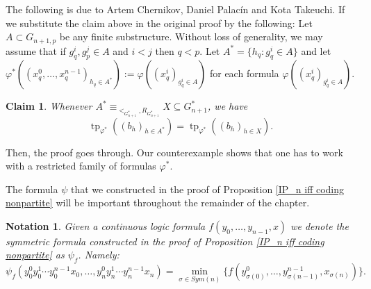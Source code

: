 \documentclass{amsart}
\newtheorem*{claim}{Claim}
\newtheorem{notation}{Notation}
\newtheorem{external claim}[teor]{Claim}
\DeclareMathOperator{\tp}{{tp}}
\begin{document}
The following is due to Artem Chernikov, Daniel Palacín and Kota Takeuchi. If we substitute the claim above in the original proof by the following: Let $A\subset G_{n+1,p}$ be any finite substructure. Without loss of generality, we may assume that if $g^i_q,g^j_p\in A$ and $i<j$ then $q<p$. Let $A^*=\{ h_q: g^i_q\in A \}$ and let $\varphi^*((x^0_q,\dots,x^{n-1}_q)_{h_q\in A^*}):=\varphi((x^i_q)_{g^i_q\in A})$ for each formula $\varphi((x^i_q)_{g^i_q\in A})$. 
\begin{claim}
  Whenever $A^*\equiv_{<_{G^*_{n+1}},R_{G^*_{n+1}}}X \subseteq G^*_{n+1}$, we have $$ \tp_{\varphi^*}( (b_h)_{h\in A^*} )=\tp_{\varphi^*}((b_h)_{h\in X}) .$$
\end{claim}
Then, the proof goes through. Our counterexample shows that one has to work with a restricted family of formulas $\varphi^*$.


The formula $\psi$ that we constructed in the proof of Proposition \ref{IP_n iff coding nonpartite} will be important throughout the remainder of the chapter.

\begin{notation}\label{notation psi_f}
     Given a continuous logic formula $f(y_0,\dots,y_{n-1},x)$ we denote the symmetric formula constructed in the proof of Proposition \ref{IP_n iff coding nonpartite} as $\psi_f$. Namely: $$ \psi_f(y^0_0y^1_0\cdots y^{n-1}_0x_0,\dots,y^0_ny^1_n\cdots y^{n-1}_nx_n)=\min_{\sigma\in Sym(n)} \{ f(y^0_{\sigma(0)},\dots ,y^{n-1}_{\sigma({n-1})},x_{\sigma(n)}) \}.$$
\end{notation}
\end{document}
